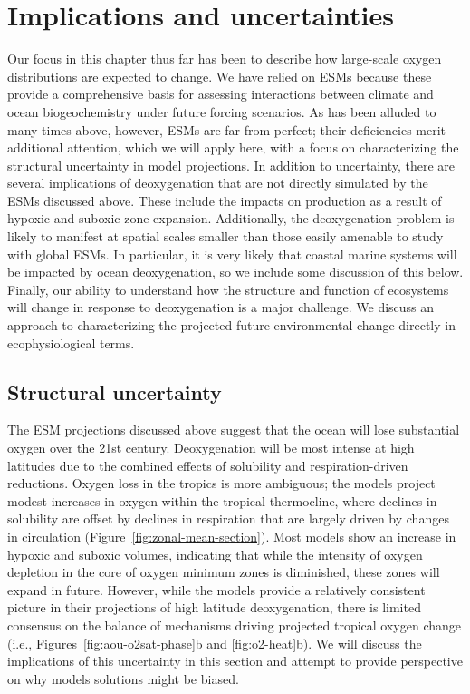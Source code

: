 \documentclass[draft,linenumbers]{report_chapter}
\begin{document}
\section{Implications and uncertainties}

Our focus in this chapter thus far has been to describe how large-scale oxygen distributions are expected to change.
We have relied on ESMs because these provide a comprehensive basis for assessing interactions between climate and ocean biogeochemistry under future forcing scenarios.
As has been alluded to many times above, however, ESMs are far from perfect; their deficiencies merit additional attention, which we will apply here, with a focus on characterizing the structural uncertainty in model projections.
In addition to uncertainty, there are several implications of deoxygenation that are not directly simulated by the ESMs discussed above.
These include the impacts on  production as a result of hypoxic and suboxic zone expansion.
Additionally, the deoxygenation problem is likely to manifest at spatial scales smaller than those easily amenable to study with global ESMs.
In particular, it is very likely that coastal marine systems will be impacted by ocean deoxygenation, so we include some discussion of this below.
Finally, our ability to understand how the structure and function of ecosystems will change in response to deoxygenation is a major challenge.
We discuss an approach to characterizing the projected future environmental change directly in ecophysiological terms.

\subsection{Structural uncertainty} \label{loc:structural-uncertainty}

The ESM projections discussed above suggest that the ocean will lose substantial oxygen over the 21st century.
Deoxygenation will be most intense at high latitudes due to the combined effects of solubility and respiration-driven reductions.
Oxygen loss in the tropics is more ambiguous; the models project modest increases in oxygen within the tropical thermocline, where declines in solubility are offset by declines in respiration that are largely driven by changes in circulation (Figure~\ref{fig:zonal-mean-section}).
Most models show an increase in hypoxic and suboxic volumes, indicating that while the intensity of oxygen depletion in the core of oxygen minimum zones is diminished, these zones will expand in future.
However, while the models provide a relatively consistent picture in their projections of high latitude deoxygenation, there is limited consensus on the balance of mechanisms driving projected tropical oxygen change (i.e., Figures~\ref{fig:aou-o2sat-phase}b and \ref{fig:o2-heat}b).
We will discuss the implications of this uncertainty in this section and attempt to provide perspective on why models solutions might be biased.
\end{document}
